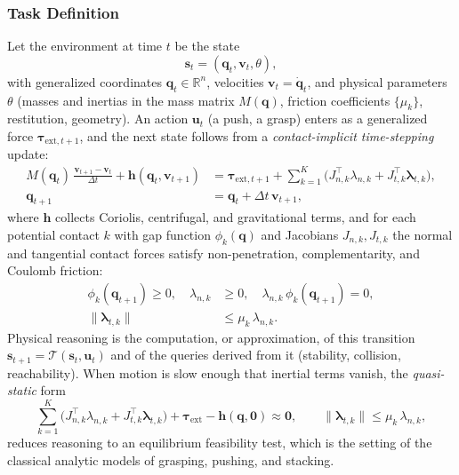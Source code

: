 \subsubsection{Task Definition}
Let the environment at time $t$ be the state
\begin{equation}
    \mathbf{s}_t = (\mathbf{q}_t, \mathbf{v}_t, \theta),
\end{equation}
with generalized coordinates $\mathbf{q}_t \in \mathbb{R}^n$, velocities $\mathbf{v}_t=\dot{\mathbf{q}}_t$, and physical parameters $\theta$ (masses and inertias in the mass matrix $M(\mathbf{q})$, friction coefficients $\{\mu_k\}$, restitution, geometry). An action $\mathbf{u}_t$ (a push, a grasp) enters as a generalized force $\boldsymbol{\tau}_{\mathrm{ext},t+1}$, and the next state follows from a \emph{contact-implicit time-stepping} update:
\begin{equation}
\begin{aligned}
M(\mathbf{q}_{t})\,\frac{\mathbf{v}_{t+1}-\mathbf{v}_{t}}{\Delta t}
+ \mathbf{h}(\mathbf{q}_{t},\mathbf{v}_{t+1})
&= \boldsymbol{\tau}_{\mathrm{ext},t+1}
+ \sum_{k=1}^{K}\Big(J_{n,k}^\top \lambda_{n,k} + J_{t,k}^\top \boldsymbol{\lambda}_{t,k}\Big), \\
\mathbf{q}_{t+1}&=\mathbf{q}_{t}+\Delta t\,\mathbf{v}_{t+1},
\end{aligned}
\end{equation}
where $\mathbf{h}$ collects Coriolis, centrifugal, and gravitational terms, and for each potential contact $k$ with gap function $\phi_k(\mathbf{q})$ and Jacobians $J_{n,k},J_{t,k}$ the normal and tangential contact forces satisfy non-penetration, complementarity, and Coulomb friction:
\begin{equation}
\begin{aligned}
\phi_k(\mathbf{q}_{t+1}) \ge 0,\quad \lambda_{n,k}&\ge 0,\quad \lambda_{n,k}\,\phi_k(\mathbf{q}_{t+1})=0,\\
\|\boldsymbol{\lambda}_{t,k}\| &\le \mu_k\,\lambda_{n,k}.
\end{aligned}
\label{eq:p3_s7_1_2_contact}
\end{equation}
Physical reasoning is the computation, or approximation, of this transition $\mathbf{s}_{t+1}=\mathcal{T}(\mathbf{s}_t,\mathbf{u}_t)$ and of the queries derived from it (stability, collision, reachability). When motion is slow enough that inertial terms vanish, the \emph{quasi-static} form
\begin{equation}
\sum_{k=1}^{K}\Big(J_{n,k}^\top \lambda_{n,k} + J_{t,k}^\top \boldsymbol{\lambda}_{t,k}\Big) + \boldsymbol{\tau}_{\mathrm{ext}} - \mathbf{h}(\mathbf{q},\mathbf{0}) \approx \mathbf{0},
\qquad \|\boldsymbol{\lambda}_{t,k}\| \le \mu_k\,\lambda_{n,k},
\end{equation}
reduces reasoning to an equilibrium feasibility test, which is the setting of the classical analytic models of grasping, pushing, and stacking.

